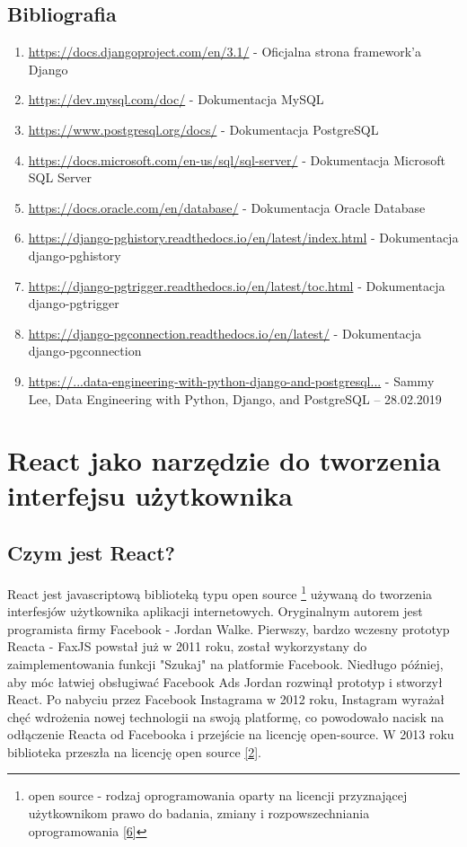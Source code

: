 \documentclass[oneside,polski,logo,indent]{amuthesis}
\begin{document}
\begin{enumerate}
\begin{enumerate}
\section{Bibliografia}
\begin{enumerate}[leftmargin=5pt,rightmargin=5pt]
\item \url{https://docs.djangoproject.com/en/3.1/} - Oficjalna strona framework’a Django
\item \url{https://dev.mysql.com/doc/} - Dokumentacja MySQL
\item \url{https://www.postgresql.org/docs/} - Dokumentacja PostgreSQL
\item \url{https://docs.microsoft.com/en-us/sql/sql-server/} - Dokumentacja Microsoft SQL Server
\item \url{https://docs.oracle.com/en/database/} - Dokumentacja Oracle Database
\item \url{https://django-pghistory.readthedocs.io/en/latest/index.html} - Dokumentacja django-pghistory
\item \url{https://django-pgtrigger.readthedocs.io/en/latest/toc.html} - Dokumentacja django-pgtrigger
\item \url{https://django-pgconnection.readthedocs.io/en/latest/} - Dokumentacja django-pgconnection
\item \href{https://towardsdatascience.com/data-engineering-with-python-django-and-postgresql-99409492769}{https://...data-engineering-with-python-django-and-postgresql...} - Sammy Lee, Data Engineering with Python, Django, and PostgreSQL – 28.02.2019
\end{enumerate}

\chapter {React jako narzędzie do tworzenia interfejsu użytkownika}

\section{Czym jest React?}
{
React jest javascriptową biblioteką typu open source \footnote{open source - rodzaj oprogramowania oparty na licencji przyznającej użytkownikom prawo do badania, zmiany i rozpowszechniania oprogramowania \hyperlink{[6]}{[6]}} używaną do tworzenia interfesjów użytkownika aplikacji internetowych. Oryginalnym autorem jest programista firmy Facebook - Jordan Walke. Pierwszy, bardzo wczesny prototyp Reacta - FaxJS powstał już w 2011 roku, został wykorzystany do zaimplementowania funkcji "Szukaj" na platformie Facebook. Niedługo później, aby móc łatwiej obsługiwać Facebook Ads Jordan rozwinął prototyp i stworzył React. Po nabyciu przez Facebook Instagrama w 2012 roku, Instagram wyrażał chęć wdrożenia nowej technologii na swoją platformę, co powodowało nacisk na odłączenie Reacta od Facebooka i przejście na licencję open-source. W 2013 roku biblioteka przeszła na licencję open source \hyperlink{[2]}{[2]}. 
\newline

}
\end{enumerate}
\end{enumerate}
\end{document}
